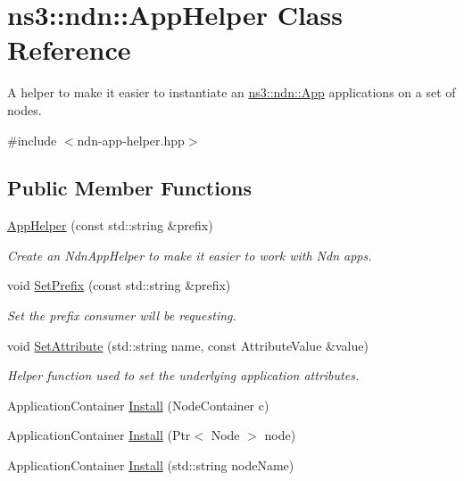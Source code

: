 \hypertarget{classns3_1_1ndn_1_1AppHelper}{}\section{ns3\+:\+:ndn\+:\+:App\+Helper Class Reference}
\label{classns3_1_1ndn_1_1AppHelper}


A helper to make it easier to instantiate an \hyperlink{classns3_1_1ndn_1_1App}{ns3\+::ndn\+::\+App} applications on a set of nodes.  




{\ttfamily \#include $<$ndn-\/app-\/helper.\+hpp$>$}

\subsection*{Public Member Functions}
\begin{DoxyCompactItemize}
\item 
\hyperlink{classns3_1_1ndn_1_1AppHelper_a59eeaad1a642c4f6d4f65a5471591776}{App\+Helper} (const std\+::string \&prefix)
\begin{DoxyCompactList}\small\item\em Create an Ndn\+App\+Helper to make it easier to work with Ndn apps. \end{DoxyCompactList}\item 
void \hyperlink{classns3_1_1ndn_1_1AppHelper_a67d941c1628aceef4b8add5c564ed3df}{Set\+Prefix} (const std\+::string \&prefix)\hypertarget{classns3_1_1ndn_1_1AppHelper_a67d941c1628aceef4b8add5c564ed3df}{}\label{classns3_1_1ndn_1_1AppHelper_a67d941c1628aceef4b8add5c564ed3df}

\begin{DoxyCompactList}\small\item\em Set the prefix consumer will be requesting. \end{DoxyCompactList}\item 
void \hyperlink{classns3_1_1ndn_1_1AppHelper_a459f3dbfc8a64c315af610df1b652689}{Set\+Attribute} (std\+::string name, const Attribute\+Value \&value)
\begin{DoxyCompactList}\small\item\em Helper function used to set the underlying application attributes. \end{DoxyCompactList}\item 
Application\+Container \hyperlink{classns3_1_1ndn_1_1AppHelper_a91d418e35a292f4d734fc9a4b7637732}{Install} (Node\+Container c)
\item 
Application\+Container \hyperlink{classns3_1_1ndn_1_1AppHelper_ab0f03bf5c89a84845edbce05b47813d3}{Install} (Ptr$<$ Node $>$ node)
\item 
Application\+Container \hyperlink{classns3_1_1ndn_1_1AppHelper_a06b7fb848260f38b3ec6645ba37c8774}{Install} (std\+::string node\+Name)
\end{DoxyCompactItemize}


